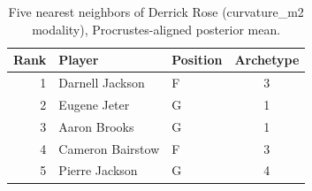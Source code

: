 \begin{table}[htbp]
  \centering\small
  \begin{tabular}{rllc}
    \toprule
    Rank & Player & Position & Archetype \\
    \midrule
    1 & Darnell Jackson & F & 3 \\
    2 & Eugene Jeter & G & 1 \\
    3 & Aaron Brooks & G & 1 \\
    4 & Cameron Bairstow & F & 3 \\
    5 & Pierre Jackson & G & 4 \\
    \bottomrule
  \end{tabular}
  \caption{Five nearest neighbors of Derrick Rose (curvature_m2 modality), Procrustes-aligned posterior mean.}
  \label{tab:Derrick_Rose_neighbors_curvature_m2}
\end{table}

